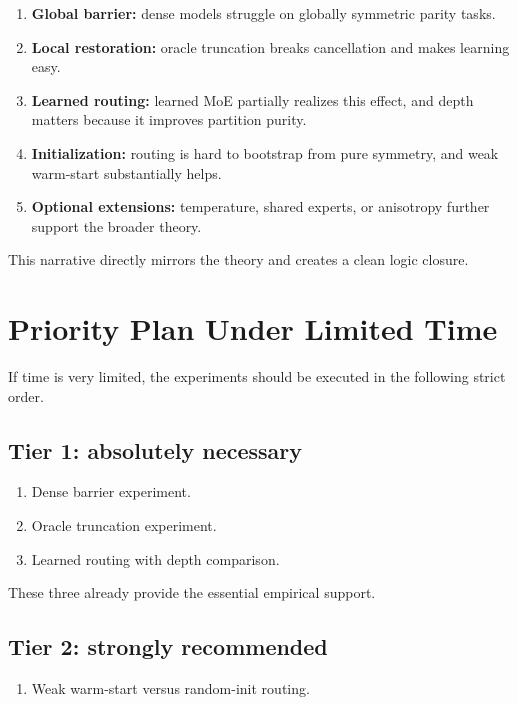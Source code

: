 \documentclass[11pt]{article}
\begin{document}
\begin{enumerate}[leftmargin=2em]
    \item \textbf{Global barrier:} dense models struggle on globally symmetric parity tasks.
    \item \textbf{Local restoration:} oracle truncation breaks cancellation and makes learning easy.
    \item \textbf{Learned routing:} learned MoE partially realizes this effect, and depth matters because it improves partition purity.
    \item \textbf{Initialization:} routing is hard to bootstrap from pure symmetry, and weak warm-start substantially helps.
    \item \textbf{Optional extensions:} temperature, shared experts, or anisotropy further support the broader theory.
\end{enumerate}

This narrative directly mirrors the theory and creates a clean logic closure.

\section{Priority Plan Under Limited Time}

If time is very limited, the experiments should be executed in the following strict order.

\subsection{Tier 1: absolutely necessary}

\begin{enumerate}[leftmargin=2em]
    \item Dense barrier experiment.
    \item Oracle truncation experiment.
    \item Learned routing with depth comparison.
\end{enumerate}

These three already provide the essential empirical support.

\subsection{Tier 2: strongly recommended}

\begin{enumerate}[leftmargin=2em]
    \item Weak warm-start versus random-init routing.
\end{enumerate}
\end{document}
